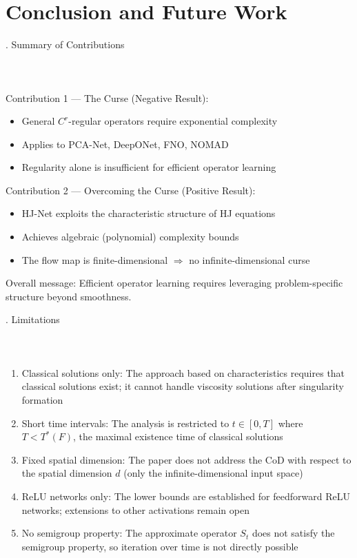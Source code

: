 \documentclass{beamer}
\def\b{\color{blue}}
\def\r{\color{red}}
\begin{document}
\section{{\Large Conclusion and Future Work}}

\begin{frame}{\thesection. Summary of Contributions}
\framesubtitle{$\quad$}
{\Large {\b Contribution 1 --- The Curse (Negative Result):}
\begin{itemize}
    \item General $ C^r $-regular operators require exponential complexity
    \item Applies to PCA-Net, DeepONet, FNO, NOMAD
    \item Regularity alone is insufficient for efficient operator learning
\end{itemize}
}
\medskip

{\Large {\b Contribution 2 --- Overcoming the Curse (Positive Result):}
\begin{itemize}
    \item HJ-Net exploits the characteristic structure of HJ equations
    \item Achieves algebraic (polynomial) complexity bounds
    \item The flow map is finite-dimensional $\Rightarrow$ no infinite-dimensional curse
\end{itemize}
}
\medskip

{\Large {\b Overall message}: Efficient operator learning requires leveraging {\r problem-specific structure} beyond smoothness.}

\end{frame}

\begin{frame}{\thesection. Limitations}
\framesubtitle{$\quad$}
{\Large 
\begin{enumerate}
    \item {\b Classical solutions only}: The approach based on characteristics requires that classical solutions exist; it cannot handle viscosity solutions after singularity formation
    \item {\b Short time intervals}: The analysis is restricted to $ t \in [0, T] $ where $ T < T^*(F) $, the maximal existence time of classical solutions
    \item {\b Fixed spatial dimension}: The paper does not address the CoD with respect to the spatial dimension $ d $ (only the infinite-dimensional input space)
    \item {\b ReLU networks only}: The lower bounds are established for feedforward ReLU networks; extensions to other activations remain open
    \item {\b No semigroup property}: The approximate operator $ S_t $ does not satisfy the semigroup property, so iteration over time is not directly possible
\end{enumerate}
}

\end{frame}
\end{document}
